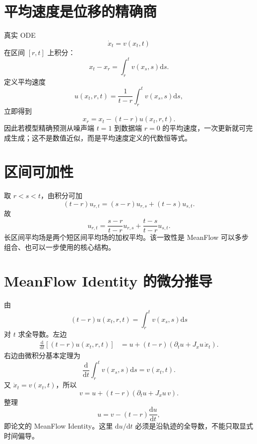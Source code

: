 \documentclass[UTF8,12pt,a4paper,fontset=none]{ctexart}
\numberwithin{equation}{section}
\newcommand{\dd}{\mathrm{d}}
\begin{document}
\section{平均速度是位移的精确商}
真实 ODE
\begin{equation}
 \dot x_t=v(x_t,t)
\end{equation}
在区间 $[r,t]$ 上积分：
\begin{equation}
 x_t-x_r=\int_r^tv(x_s,s)\dd s.
\end{equation}
定义平均速度
\begin{equation}
 u(x_t,r,t)=\frac1{t-r}\int_r^tv(x_s,s)\dd s,
\end{equation}
立即得到
\begin{equation}
 \boxed{x_r=x_t-(t-r)u(x_t,r,t).}
\end{equation}
因此若模型精确预测从噪声端 $t=1$ 到数据端 $r=0$ 的平均速度，一次更新就可完成生成；这不是数值近似，而是平均速度定义的代数恒等式。

\section{区间可加性}
取 $r<s<t$，由积分可加
\begin{equation}
 (t-r)u_{r,t}=(s-r)u_{r,s}+(t-s)u_{s,t}.
\end{equation}
故
\begin{equation}
 \boxed{
 u_{r,t}=\frac{s-r}{t-r}u_{r,s}
 +\frac{t-s}{t-r}u_{s,t}.
 }
\end{equation}
长区间平均场是两个短区间平均场的加权平均。该一致性是 MeanFlow 可以多步组合、也可以一步使用的核心结构。

\section{MeanFlow Identity 的微分推导}
由
\begin{equation}
 (t-r)u(x_t,r,t)=\int_r^tv(x_s,s)\dd s
\end{equation}
对 $t$ 求全导数。左边
\begin{align}
 \frac{\dd}{\dd t}[(t-r)u(x_t,r,t)]
 &=u+(t-r)\left(\partial_tu+J_xu\,\dot x_t\right).
\end{align}
右边由微积分基本定理为
\begin{equation}
 \frac{\dd}{\dd t}\int_r^tv(x_s,s)\dd s=v(x_t,t).
\end{equation}
又 $\dot x_t=v(x_t,t)$，所以
\begin{equation}
 \boxed{
 v=u+(t-r)(\partial_tu+J_xu\,v).
 }
\end{equation}
整理
\begin{equation}
 u=v-(t-r)\frac{\dd u}{\dd t},
\end{equation}
即论文的 MeanFlow Identity。这里 $\dd u/\dd t$ 必须是沿轨迹的全导数，不能只取显式时间偏导。
\end{document}
